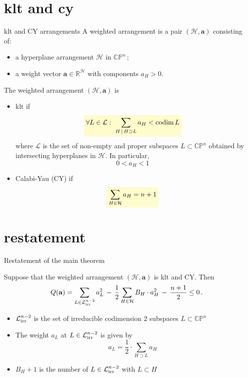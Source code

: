 \documentclass{beamer}
\newcommand{\R}{\mathbb{R}}
\newcommand{\CP}{\mathbb{CP}}
\newcommand{\mH}{\mathcal{H}}
\newcommand{\mL}{\mathcal{L}}
\newcommand{\ba}{\mathbf{a}}
\newcommand{\mLi}{\mathcal{L}_{\textup{irr}}}
\DeclareMathOperator{\codim}{codim}
\newcommand{\mathcolorbox}[2]{\colorbox{#1}{$\displaystyle #2$}}
\begin{document}
\section{klt and cy}
\begin{frame}{klt and CY arrangements}
	A weighted arrangement is a pair \((\mH, \ba)\) consisting of:
	\begin{itemize}
		\item a hyperplane arrangement \(\mH\) in \(\CP^n\)\,;
		\item a weight vector \(\ba \in \R^{\mH}\) with components \(a_H > 0\).
	\end{itemize}
	
	
	
	
	The weighted arrangement \((\mH, \ba)\) is
	\begin{itemize}
		\item  klt if
		\[
		\mathcolorbox{yellow!20}{
	\forall L \in \mL: \,\, \sum_{H \,|\, H \supset L} a_H < \codim L 	
	}
		\] 
		where \(\mL\) is the set of non-empty and proper subspaces \(L \subset \CP^n\) obtained by intersecting hyperplanes in \(\mH\).
		In particular, 
		\[0 < a_H < 1 \]
		\item  Calabi-Yau (CY) if
		\[
		\mathcolorbox{yellow!20}{
			\sum_{H \in \mH} a_H = n+1 	
		}
		\] 
	\end{itemize}
\end{frame}

\section{restatement}
\begin{frame}{Restatement of the main theorem}
	\begin{theorem}
		Suppose that the weighted arrangement \((\mH, \ba)\) is klt and CY. Then
		\[
		Q(\ba) = \sum_{L \in \mLi^{n-2}} a_L^2 \,-\, \frac{1}{2} \sum_{H \in \mH} B_H \cdot a_H^2 \,-\, \frac{n+1}{2} \leq 0 \,.
		\]
	\end{theorem}
\begin{itemize}
	\item \(\mLi^{n-2}\) is the set of irreducible codimension \(2\) subspaces \(L \subset \CP^n\)
	\item The weight \(a_L\) at \(L \in \mLi^{n-2}\) is given by
	\[
	a_L = \frac{1}{2} \cdot \sum_{H \supset L} a_H
	\]
	\item \(B_H + 1\) is the number of \(L \in \mLi^{n-2}\) with \(L \subset H\)
\end{itemize}
\end{frame}
\end{document}
